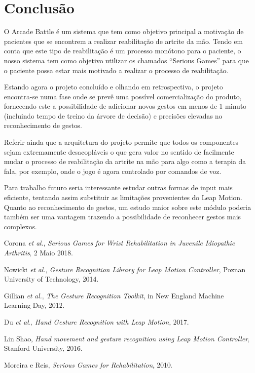 \documentclass{TTUPhD}
\begin{document}
\section{Conclusão}

O Arcade Battle é um sistema que tem como objetivo principal a motivação de pacientes que se encontrem a realizar reabilitação de artrite da mão. Tendo em conta que este tipo de reabilitação é um processo monótono para o paciente, o nosso sistema tem como objetivo utilizar os chamados ``Serious Games'' para que o paciente possa estar mais motivado a realizar o processo de reabilitação.

Estando agora o projeto concluído e olhando em retrospectiva, o projeto encontra-se numa fase onde se prevê uma possível comercialização do produto, fornecendo este a possibilidade
de adicionar novos gestos em menos de 1 minuto (incluindo tempo de treino da árvore de decisão) e precisões elevadas no reconhecimento de gestos.

Referir ainda que a arquitetura do projeto permite que todos os componentes sejam extremamente desacopláveis o que gera valor no sentido de facilmente mudar o processo de reabilitação da artrite na mão para algo como a terapia da fala, por exemplo, onde o jogo é agora controlado por comandos de voz.

Para trabalho futuro seria interessante estudar outras formas de input mais eficiente, tentando assim substituir as limitações provenientes do Leap Motion. Quanto ao reconhecimento de gestos, um estudo maior sobre este módulo poderia também ser uma vantagem trazendo a possibilidade de reconhecer gestos mais complexos.

\begin{thebibliography}{9}

    Corona \textit{et al.},
    \textit{Serious Games for Wrist Rehabilitation in Juvenile Idiopathic Arthritis},
    2 Maio 2018.

    Nowicki \textit{et al.},
    \textit{Gesture Recognition Library for Leap Motion Controller},
    Poznan University of Technology, 2014.

    Gillian \textit{et al.},
    \textit{The Gesture Recognition Toolkit}, in New England Machine Learning Day,
    2012.

    Du \textit{et al.},
    \textit{Hand Gesture Recognition with Leap Motion},
    2017.

    Lin Shao,
    \textit{Hand movement and gesture recognition using Leap Motion Controller},
    Stanford University, 2016.

    Moreira e Reis,
    \textit{Serious Games for Rehabilitation},
    2010.

\end{thebibliography}
\end{document}
